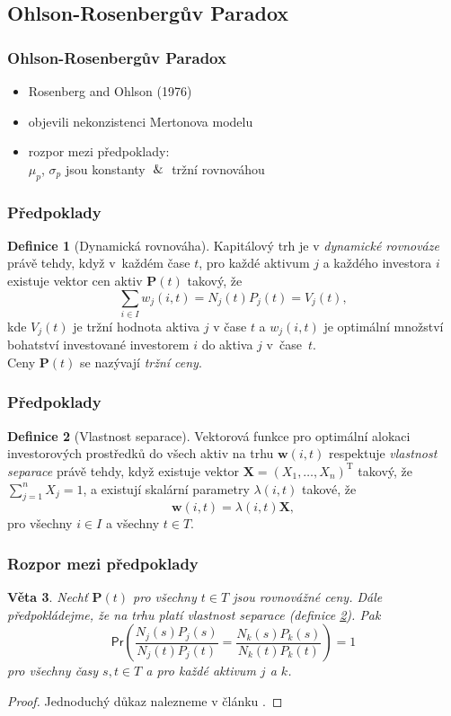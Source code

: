 \documentclass[xcolor=dvipsnames]{beamer}
\newtheorem{veta}{Věta}
\theoremstyle{definition} \newtheorem{definice}[veta]{Definice}
\theoremstyle{remark}
\begin{document}
\subsection{Ohlson-Rosenbergův Paradox}
\begin{frame}
  \frametitle{Ohlson-Rosenbergův Paradox}
   \begin{itemize}
   \item Rosenberg and Ohlson (1976)
   \item objevili nekonzistenci Mertonova modelu
   \item rozpor mezi předpoklady: \\
    $\mu_p$, $\sigma_p$ jsou \textcolor{OliveGreen}{konstanty} $\And$ \textcolor{OliveGreen}{tržní rovnováhou}
   \end{itemize} 
\end{frame}

\begin{frame}
  \frametitle{Předpoklady}
  \begin{definice}[Dynamická rovnováha]
  Kapitálový trh je v \textit{dynamické rovnováze} právě tehdy, když
  v~každém čase $t$, pro každé aktivum $j$ a každého investora $i$ existuje vektor cen aktiv $\boldsymbol{P}(t)$ takový, že
  $$\sum_{i\in I} w_{j}(i,t)=N_j(t)P_j(t)=V_j(t),$$
 kde $V_j(t)$ je tržní hodnota aktiva $j$ v čase $t$ a $ w_{j}(i,t)$ je optimální množství bohatství investované investorem $i$ do aktiva $j$ v~čase~$t$.\\
  Ceny $\boldsymbol{P}(t)$ se nazývají  \textit{tržní ceny}.
  \end{definice}
\end{frame}

\begin{frame}
  \frametitle{Předpoklady}
  \begin{definice}[Vlastnost separace]\label{vlastnost_separace}
Vektorová funkce pro optimální alokaci investorových prostředků do všech aktiv na trhu $\boldsymbol{w}(i,t)$ respektuje \textit{vlastnost separace} právě tehdy, když existuje vektor $\boldsymbol{X}=(X_1,\dots,X_n)^\mathrm{T}$ takový, že $\sum_{j=1}^nX_j=1$, a existují skalární parametry $\lambda(i,t)$ takové, že
$$\boldsymbol{w}(i,t)=\lambda(i,t)\boldsymbol{X},$$
pro všechny $i\in I$ a všechny $t\in T$.
\end{definice}
\end{frame}

\begin{frame}
  \frametitle{Rozpor mezi předpoklady}
\begin{veta} \label{T1}
Nechť $\boldsymbol{P}(t)$ pro všechny $t\in T$  jsou rovnovážné ceny.
Dále předpokládejme, že na trhu platí vlastnost separace (definice \ref{vlastnost_separace}).
Pak
\begin{equation}\label{T1_eq}
\mathsf{Pr}\left(\frac{N_j(s)P_j(s)}{N_j(t)P_j(t)}=\frac{N_k(s)P_k(s)}{N_k(t)P_k(t)}\right)=1
\end{equation}
pro všechny časy $s,t\in T$  a pro každé aktivum $j$ a $k$.
\end{veta}

\begin{proof}
Jednoduchý důkaz nalezneme v článku \cite{ohlson}.
\end{proof}
\end{frame}
\end{document}
